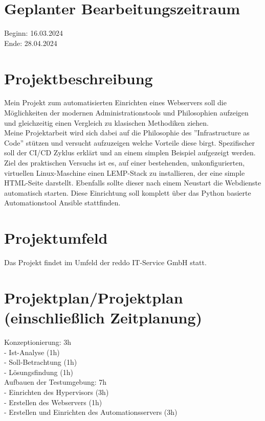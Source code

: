 \documentclass[11pt]{article}
\begin{document}
\section{Geplanter Bearbeitungszeitraum}
Beginn: 16.03.2024\\
Ende: 28.04.2024\\

\section{Projektbeschreibung}
Mein Projekt zum automatisierten Einrichten eines Webservers soll die 
Möglichkeiten der modernen Administrationstools
und Philosophien aufzeigen und gleichzeitig einen Vergleich zu klasischen Methodiken ziehen.\\

Meine Projektarbeit wird sich dabei auf die Philosophie des ''Infrastructure as Code'' st\"utzen und versucht
aufzuzeigen welche Vorteile diese birgt. Spezifischer soll der CI/CD Zyklus erklärt
und an einem simplen Beispiel aufgezeigt werden.\\

Ziel des praktischen Versuchs ist es, auf einer bestehenden, unkonfigurierten, virtuellen Linux-Maschine einen LEMP-Stack
zu installieren, der eine simple HTML-Seite darstellt. Ebenfalls sollte dieser nach einem Neustart die Webdienste
automatisch starten. Diese Einrichtung soll komplett über das Python basierte Automationstool Ansible stattfinden. 

\section{Projektumfeld}
Das Projekt findet im Umfeld der reddo IT-Service GmbH statt.

\section{Projektplan/Projektplan (einschließlich Zeitplanung)}

Konzeptionierung: 3h\\
- Ist-Analyse (1h)\\
- Soll-Betrachtung (1h)\\
- Lösungsfindung (1h)\\

Aufbauen der Testumgebung: 7h\\
- Einrichten des Hypervisors (3h)\\
- Erstellen des Webservers (1h)\\
- Erstellen und Einrichten des Automationsservers (3h)\\
\end{document}
